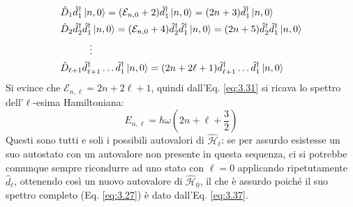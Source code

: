\begin{equation*}
	\begin{split}
		&\hat{D}_1 \hat{d}_1^{\dagger} \ket{n,0} = (\mathcal{E}_{n,0} + 2) \hat{d}_1^{\dagger} \ket{n,0} = (2n + 3) \hat{d}_1^{\dagger} \ket{n,0}\\
		&\hat{D}_2 \hat{d}_2^{\dagger} \hat{d}_1^{\dagger} \ket{n,0} = (\mathcal{E}_{n,0} + 4) \hat{d}_2^{\dagger} \hat{d}_1^{\dagger} \ket{n,0} = (2n + 5) \hat{d}_2^{\dagger} \hat{d}_1^{\dagger} \ket{n,0}\\
		&\qquad\quad\vdots\\
		&\hat{D}_{\ell + 1} \hat{d}_{\ell + 1}^{\dagger} \dots \hat{d}_1^{\dagger} \ket{n,0} = (2n + 2\ell + 1) \hat{d}_{\ell + 1}^{\dagger} \dots \hat{d}_1^{\dagger} \ket{n,0}
	\end{split}
\end{equation*}
Si evince che $ \mathcal{E}_{n,\ell} = 2n + 2\ell + 1 $, quindi dall'Eq. \ref{eq:3.31} si ricava lo spettro dell'$ \ell $-esima Hamiltoniana:
\begin{equation}
	E_{n,\ell} = \hbar \omega \left( 2n + \ell + \frac{3}{2} \right)
	\label{eq:3.37}
\end{equation}
Questi sono tutti e soli i possibili autovalori di $ \hat{\mathcal{H}}_{\ell} $: se per assurdo esistesse un suo autostato con un autovalore non presente in questa sequenza, ci si potrebbe comunque sempre ricondurre ad uno stato con $ \ell = 0 $ applicando ripetutamente $ \hat{d}_{\ell} $, ottenendo così un nuovo autovalore di $ \hat{\mathcal{H}}_0 $, il che è assurdo poiché il suo spettro completo (Eq. \ref{eq:3.27}) è dato dall'Eq. \ref{eq:3.37}.










